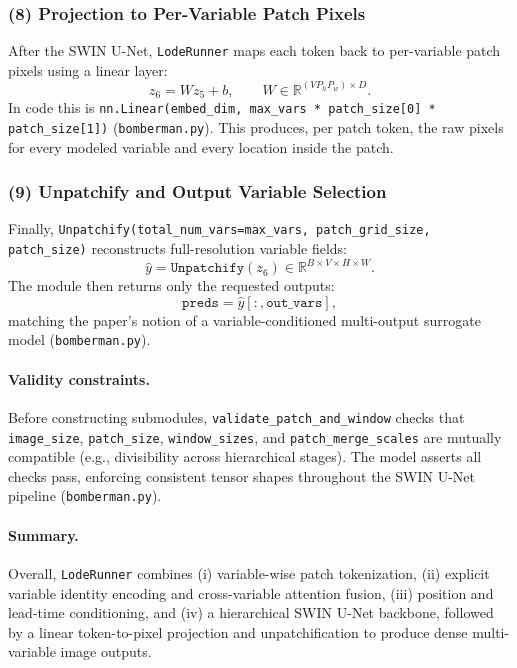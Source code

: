 \documentclass{article} %
\begin{document}
\subsubsection{(8) Projection to Per-Variable Patch Pixels}
\label{subsec:linear4unpatch}
After the SWIN U-Net, \texttt{LodeRunner} maps each token back to per-variable patch pixels using a linear layer:
\[
z_6 = W z_5 + b,\qquad
W \in \mathbb{R}^{(V P_h P_w)\times D}.
\]
In code this is \texttt{nn.Linear(embed\_dim, max\_vars * patch\_size[0] * patch\_size[1])} (\texttt{bomberman.py}). This produces, per patch token, the raw pixels for every modeled variable and every location inside the patch.

\subsubsection{(9) Unpatchify and Output Variable Selection}
\label{subsec:unpatchify}
Finally, \texttt{Unpatchify(total\_num\_vars=max\_vars, patch\_grid\_size, patch\_size)} reconstructs full-resolution variable fields:
\[
\hat{y} = \texttt{Unpatchify}(z_6)\in \mathbb{R}^{B\times V\times H\times W}.
\]
The module then returns only the requested outputs:
\[
\texttt{preds} = \hat{y}[:, \texttt{out\_vars}],
\]
matching the paper’s notion of a variable-conditioned multi-output surrogate model (\texttt{bomberman.py}).

\paragraph{Validity constraints.}
Before constructing submodules, \texttt{validate\_patch\_and\_window} checks that \texttt{image\_size}, \texttt{patch\_size}, \texttt{window\_sizes}, and \texttt{patch\_merge\_scales} are mutually compatible (e.g., divisibility across hierarchical stages). The model asserts all checks pass, enforcing consistent tensor shapes throughout the SWIN U-Net pipeline (\texttt{bomberman.py}).

\paragraph{Summary.}
Overall, \texttt{LodeRunner} combines (i) variable-wise patch tokenization, (ii) explicit variable identity encoding and cross-variable attention fusion, (iii) position and lead-time conditioning, and (iv) a hierarchical SWIN U-Net backbone, followed by a linear token-to-pixel projection and unpatchification to produce dense multi-variable image outputs.
\end{document}

